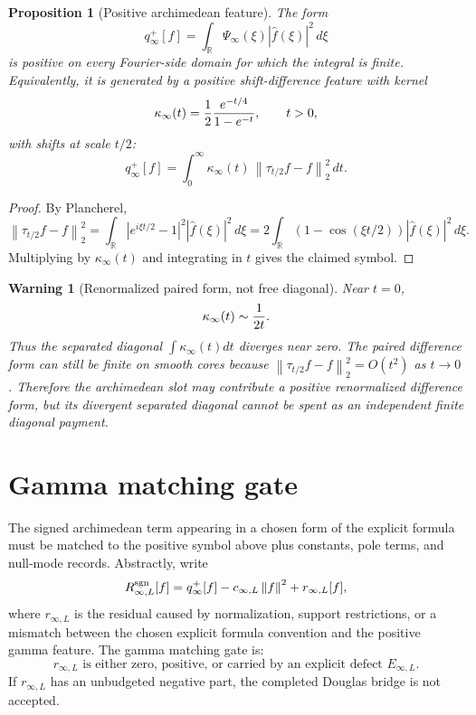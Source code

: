 \documentclass[11pt]{article}
\newtheorem{proposition}{Proposition}
\newtheorem{warning}{Warning}
\newcommand{\R}{\mathbb R}
\newcommand{\norm}[1]{\left\lVert #1\right\rVert}
\begin{document}
\begin{proposition}[Positive archimedean feature]
The form
\begin{equation}
q_\infty^+[f]
=\int_\R \Psi_\infty(\xi)|\widehat f(\xi)|^2\,d\xi
\end{equation}
is positive on every Fourier-side domain for which the integral is finite. Equivalently, it is generated by a positive shift-difference feature with kernel
\begin{equation}
\kappa_\infty(t)={1\over 2}{e^{-t/4}\over 1-e^{-t}},\qquad t>0,
\end{equation}
with shifts at scale $t/2$:
\begin{equation}
q_\infty^+[f]
=\int_0^\infty \kappa_\infty(t)\,\norm{\tau_{t/2}f-f}_{2}^{2}\,dt.
\end{equation}
\end{proposition}

\begin{proof}
By Plancherel,
\begin{equation}
\norm{\tau_{t/2}f-f}_{2}^{2}
=\int_\R |e^{i\xi t/2}-1|^2|\widehat f(\xi)|^2\,d\xi
=2\int_\R(1-\cos(\xi t/2))|\widehat f(\xi)|^2\,d\xi.
\end{equation}
Multiplying by $\kappa_\infty(t)$ and integrating in $t$ gives the claimed symbol.
\end{proof}

\begin{warning}[Renormalized paired form, not free diagonal]
Near $t=0$,
\begin{equation}
\kappa_\infty(t)\sim {1\over 2t}.
\end{equation}
Thus the separated diagonal $\int\kappa_\infty(t)dt$ diverges near zero. The paired difference form can still be finite on smooth cores because $\norm{\tau_{t/2}f-f}_2^2=O(t^2)$ as $t\to0$. Therefore the archimedean slot may contribute a positive renormalized difference form, but its divergent separated diagonal cannot be spent as an independent finite diagonal payment.
\end{warning}

\section{Gamma matching gate}
The signed archimedean term appearing in a chosen form of the explicit formula must be matched to the positive symbol above plus constants, pole terms, and null-mode records. Abstractly, write
\begin{equation}
R_{\infty,L}^{\rm sgn}[f]
= q_\infty^+[f]-c_{\infty,L}\norm f^2 + r_{\infty,L}[f],
\end{equation}
where $r_{\infty,L}$ is the residual caused by normalization, support restrictions, or a mismatch between the chosen explicit formula convention and the positive gamma feature. The gamma matching gate is:
\begin{equation}
\boxed{\quad r_{\infty,L}\text{ is either zero, positive, or carried by an explicit defect }E_{\infty,L}.\quad}
\end{equation}
If $r_{\infty,L}$ has an unbudgeted negative part, the completed Douglas bridge is not accepted.
\end{document}
